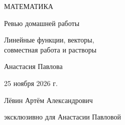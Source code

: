 \documentclass[a4paper,12pt]{article}
\begin{document}
\begin{titlepage}\centering
\vspace*{25mm}
{\Large\textcolor{accent}{МАТЕМАТИКА}}\par\vspace{15mm}
{\Huge Ревью домашней работы}\par\vspace{12mm}
{\Large\textcolor{accent}{Линейные функции, векторы,\\ совместная работа и растворы}}\par
\vfill
{\large Анастасия Павлова}\par\vspace{8mm}
25 ноября 2026 г.\par\vfill
{\small Лёвин Артём Александрович\par эксклюзивно для Анастасии Павловой}\par\vspace{14mm}
\end{titlepage}
\end{document}
